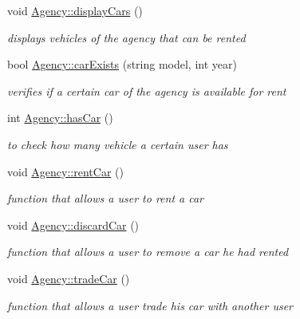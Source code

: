 \begin{DoxyCompactItemize}
\mbox{\label{group___agency_gac6f2e6884260af2dfedb7cd6f3360996}} 
void \hyperlink{group___agency_gac6f2e6884260af2dfedb7cd6f3360996}{Agency\+::display\+Cars} ()
\begin{DoxyCompactList}\small\item\em displays vehicles of the agency that can be rented \end{DoxyCompactList}\item 
bool \hyperlink{group___agency_ga3332e859279fb7f7ff27916c4b6b6ca3}{Agency\+::car\+Exists} (string model, int year)
\begin{DoxyCompactList}\small\item\em verifies if a certain car of the agency is available for rent \end{DoxyCompactList}\item 
int \hyperlink{group___agency_ga7b37fecbc7cf1524b841ac82be7a7d29}{Agency\+::has\+Car} ()
\begin{DoxyCompactList}\small\item\em to check how many vehicle a certain user has \end{DoxyCompactList}\item 
\mbox{\label{group___agency_gab797bb2fa8351c1a5d1946e5be796df7}} 
void \hyperlink{group___agency_gab797bb2fa8351c1a5d1946e5be796df7}{Agency\+::rent\+Car} ()
\begin{DoxyCompactList}\small\item\em function that allows a user to rent a car \end{DoxyCompactList}\item 
\mbox{\label{group___agency_gade564b2cc678fce19a24db37ba3ad956}} 
void \hyperlink{group___agency_gade564b2cc678fce19a24db37ba3ad956}{Agency\+::discard\+Car} ()
\begin{DoxyCompactList}\small\item\em function that allows a user to remove a car he had rented \end{DoxyCompactList}\item 
void \hyperlink{group___agency_ga1f58c5179d80187fc0b53a6da93dee90}{Agency\+::trade\+Car} ()
\begin{DoxyCompactList}\small\item\em function that allows a user trade his car with another user \end{DoxyCompactList}\item 

\end{DoxyCompactItemize}

